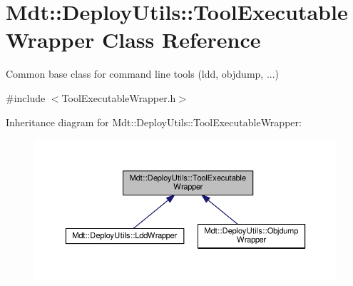 \hypertarget{class_mdt_1_1_deploy_utils_1_1_tool_executable_wrapper}{}\section{Mdt\+:\+:Deploy\+Utils\+:\+:Tool\+Executable\+Wrapper Class Reference}
\label{class_mdt_1_1_deploy_utils_1_1_tool_executable_wrapper}


Common base class for command line tools (ldd, objdump, ...)  




{\ttfamily \#include $<$Tool\+Executable\+Wrapper.\+h$>$}



Inheritance diagram for Mdt\+:\+:Deploy\+Utils\+:\+:Tool\+Executable\+Wrapper\+:
\nopagebreak
\begin{figure}[H]
\begin{center}
\leavevmode
\includegraphics[width=350pt]{class_mdt_1_1_deploy_utils_1_1_tool_executable_wrapper__inherit__graph}
\end{center}
\end{figure}
